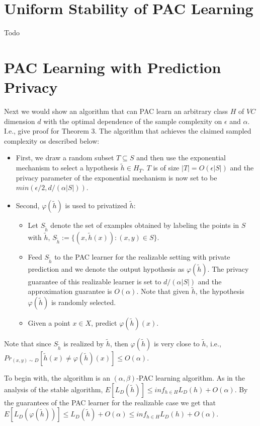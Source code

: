 \documentclass[a4paper,9pt]{scrartcl}
\begin{document}
\section{Uniform Stability of PAC Learning}

Todo

\section{PAC Learning with Prediction Privacy}

Next we would show an algorithm that can PAC learn an arbitrary class $H$ of $VC$ dimension $d$ with the optimal dependence of the sample complexity on $\epsilon$ and $\alpha$. I.e., give proof for Theorem 3.
The algorithm that achieves the claimed sampled complexity os described below:

\begin{itemize}
    \item First, we draw a random subset $T \subseteq S$ and then use the exponential mechanism to select a hypothesis $\tilde h \in H_T$. $T$ is of size $|T| = O(\epsilon|S|)$ and the privacy parameter of the exponential mechanism is now set to be $min(\epsilon/2, d/(\alpha|S|))$.
    \item Second, $\varphi(\tilde h)$  is used to privatized $\tilde h$:
    \begin{itemize}
        \item Let $S_{\tilde h}$ denote the set of examples obtained by labeling the points in $S$ with $\tilde h$, $S_{\tilde h} := \{(x, \tilde h(x)): (x, y) \in S\}$. 
        \item Feed $S_{\tilde h}$ to the PAC learner for the realizable setting with private prediction and we denote the output hypothesis as $\varphi(\tilde h)$. The privacy guarantee of this realizable learner is set to $d/(\alpha|S|)$ and the approximation guarantee is $O(\alpha)$. Note that given $\tilde h$, the hypothesis $\varphi (\tilde h)$ is randomly selected. 
        \item Given a point $x \in X$, predict $\varphi(\tilde h)(x)$.
    \end{itemize}
\end{itemize}

Note that since $S_{\tilde h}$ is realized by $\tilde h$, then $\varphi (\tilde h)$ is very close to $\tilde h$, i.e., $Pr_{(x, y) \sim D}[\tilde h(x) \not= \varphi(\tilde h)(x)] \le O(\alpha)$.

To begin with, the algorithm is an $(\alpha, \beta)$-PAC learning algorithm. As in the analysis of the stable algorithm, $E[L_D(\tilde h)] \le inf_{h \in H} L_D(h) + O(\alpha)$. By the guarantees of the PAC learner for the realizable case we get that $E[L_D(\varphi (\tilde h))] \le L_D(\tilde h) + O(\alpha) \le inf_{h \in H}L_D(h) + O(\alpha)$.
\end{document}
